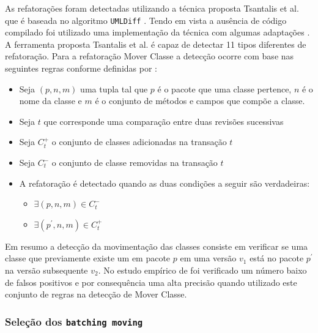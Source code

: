 \documentclass[12pt]{article}
\begin{document}
As refatorações foram detectadas utilizando a técnica proposta Tsantalis et al. \cite{Tsantalis2013}{} que é baseada no algoritmo \texttt{UMLDiff} \cite{Xing:2005:UAO:1101908.1101919}. Tendo em vista a ausência de código compilado foi utilizado uma implementação da técnica com algumas adaptações \cite{Danilo}. A ferramenta proposta Tsantalis et al. é capaz de detectar  11 tipos diferentes de refatoração. Para a refatoração Mover Classe a detecção ocorre com base nas seguintes regras conforme definidas por \cite{Biegel:2011:CSM:1985441.1985452}:
\begin{itemize}
	\item Seja $(p,n,m)$ uma tupla tal que $p$ é o pacote que uma classe pertence, $n$ é o nome da classe e $m$ é o conjunto de métodos e campos que compõe a classe.
	\item Seja $t$ que corresponde uma comparação entre duas revisões sucessivas
	\item Seja $C^{+}_{t}$ o conjunto de classes adicionadas na transação $t$
	\item Seja $C^{-}_{t}$ o conjunto de classe removidas na transação $t$
	\item A refatoração é detectado quando as duas condições a seguir são verdadeiras:
		\begin{itemize}
			\item $\exists (p,n,m) \in C^{-}_{t}$
			\item $\exists (p^{'},n,m) \in C^{+}_{t}$
		
		\end{itemize}
\end{itemize}

Em resumo a detecção da movimentação das classes consiste em verificar se uma classe que previamente existe um em pacote $p$ em uma versão $v_{1}$ está no pacote $p^{'}$ na versão subsequente $v_{2}$. No estudo empírico de \cite{Tsantalis2013} foi verificado um número baixo de falsos positivos e por consequência uma alta precisão quando utilizado este conjunto de regras na detecção de Mover Classe.

\subsubsection{Seleção dos \texttt{batching moving} }
\end{document}
